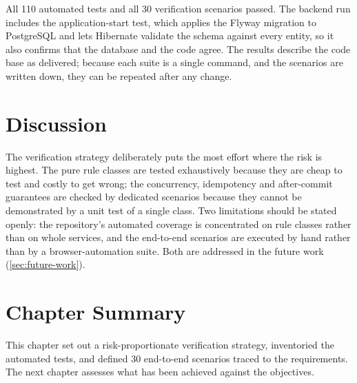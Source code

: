 All 110 automated tests and all 30 verification scenarios passed. The backend run includes the application-start test,
which applies the Flyway migration to PostgreSQL and lets Hibernate validate the schema against every entity, so it
also confirms that the database and the code agree. The results describe the code base as delivered; because each suite
is a single command, and the scenarios are written down, they can be repeated after any change.

\section{Discussion}

The verification strategy deliberately puts the most effort where the risk is highest. The pure rule classes are
tested exhaustively because they are cheap to test and costly to get wrong; the concurrency, idempotency and
after-commit guarantees are checked by dedicated scenarios because they cannot be demonstrated by a unit test of a single
class. Two limitations should be stated openly: the repository's automated coverage is concentrated on rule classes
rather than on whole services, and the end-to-end scenarios are executed by hand rather than by a browser-automation
suite. Both are addressed in the future work (\cref{sec:future-work}).

\section{Chapter Summary}

This chapter set out a risk-proportionate verification strategy, inventoried the automated tests, and defined 30
end-to-end scenarios traced to the requirements. The next chapter assesses what has been achieved against the objectives.